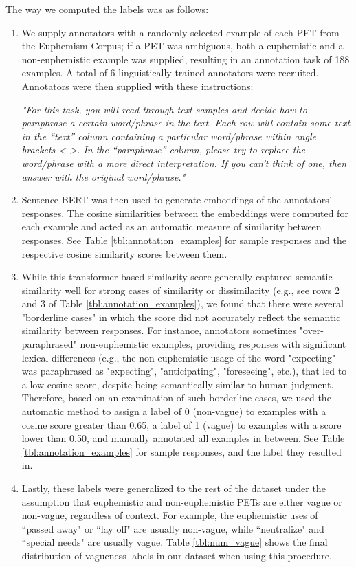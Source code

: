 \documentclass[11pt]{article}
\begin{document}
The way we computed the labels was as follows: 
\begin{enumerate}
    \item We supply annotators with a randomly selected example of each PET from the Euphemism Corpus; if a PET was ambiguous, both a euphemistic and a non-euphemistic example was supplied, resulting in an annotation task of 188 examples. A total of 6 linguistically-trained annotators were recruited. Annotators were then supplied with these instructions:
    
    \emph{"For this task, you will read through text samples and decide how to paraphrase a certain word/phrase in the text. Each row will contain some text in the “text” column containing a particular word/phrase within angle brackets < >. In the “paraphrase” column, please try to replace the word/phrase with a more direct interpretation. If you can’t think of one, then answer with the original word/phrase."}
    \item Sentence-BERT \cite{reimers2019sentencebert} was then used to generate embeddings of the annotators' responses. The cosine similarities between the embeddings were computed for each example and acted as an automatic measure of similarity between responses. See Table \ref{tbl:annotation_examples} for sample responses and the respective cosine similarity scores between them.
    \item While this transformer-based similarity score generally captured semantic similarity well for strong cases of similarity or dissimilarity (e.g., see rows 2 and 3 of Table \ref{tbl:annotation_examples}), we found that there were several "borderline cases" in which the score did not accurately reflect the semantic similarity between responses. For instance, annotators sometimes "over-paraphrased" non-euphemistic examples, providing responses with significant lexical differences (e.g., the non-euphemistic usage of the word "expecting" was paraphrased as "expecting", "anticipating", "foreseeing", etc.), that led to a low cosine score, despite being semantically similar to human judgment. Therefore, based on an examination of such borderline cases, we used the automatic method to assign a label of 0 (non-vague) to examples with a cosine score greater than 0.65, a label of 1 (vague) to examples with a score lower than 0.50, and manually annotated all examples in between. See Table \ref{tbl:annotation_examples} for sample responses, and the label they resulted in. 
    \item Lastly, these labels were generalized to the rest of the dataset under the assumption that euphemistic and non-euphemistic PETs are either vague or non-vague, regardless of context. For example, the euphemistic uses of ``passed away" or ``lay off" are usually non-vague, while ``neutralize" and ``special needs" are usually vague. Table \ref{tbl:num_vague} shows the final distribution of vagueness labels in our dataset when using this procedure.
\end{enumerate}
\end{document}
